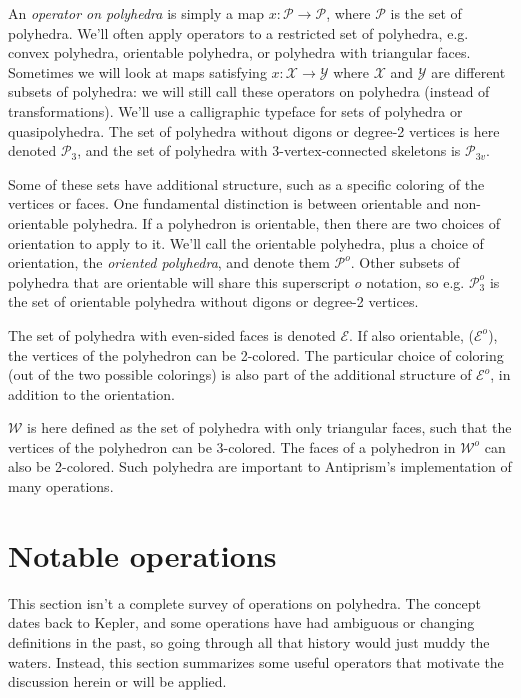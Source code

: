 \documentclass{amsart}[12pt]
\begin{document}
An \textit{operator on polyhedra} is simply a map $x : \mathcal{P} \to
\mathcal{P}$, where $\mathcal{P}$ is the set of polyhedra. We'll often apply
operators to a restricted set of polyhedra, e.g. convex polyhedra, orientable
polyhedra, or polyhedra with triangular faces. Sometimes we will look at maps
satisfying $x : \mathcal{X} \to \mathcal{Y}$ where $\mathcal{X}$ and
$\mathcal{Y}$ are different subsets of polyhedra: we will still call these
operators on polyhedra (instead of transformations). We'll use a calligraphic
typeface for sets of polyhedra or quasipolyhedra. The set of polyhedra without
digons or degree-2 vertices is here denoted $\mathcal{P}_3$, and the set of
polyhedra with 3-vertex-connected skeletons is $\mathcal{P}_{3v}$.

Some of these sets have additional structure, such as a specific coloring of
the vertices or faces. One fundamental distinction is between orientable and
non-orientable polyhedra. If a polyhedron is orientable, then there are two
choices of orientation to apply to it. We'll call the orientable polyhedra,
plus a choice of orientation, the \textit{oriented polyhedra}, and denote them
$\mathcal{P}^o$. Other subsets of polyhedra that are orientable will share this
superscript $o$ notation, so e.g. $\mathcal{P}^o_3$ is the set of orientable
polyhedra without digons or degree-2 vertices.

The set of polyhedra with even-sided faces is denoted $\mathcal{E}$. If also
orientable, ($\mathcal{E}^o$), the vertices of the polyhedron can be 2-colored.
The particular choice of coloring (out of the two possible colorings) is also
part of the additional structure of $\mathcal{E}^o$,
in addition to the orientation.

$\mathcal{W}$ is here defined as the set of polyhedra with only triangular
faces, such that the vertices of the polyhedron can be 3-colored. The faces of
a polyhedron in $\mathcal{W}^o$ can also be 2-colored. Such polyhedra are
important to Antiprism's implementation of many operations.

\section{Notable operations}

This section isn't a complete survey of operations on polyhedra. The concept
dates back to Kepler, and some operations have had ambiguous or changing
definitions in the past, so going through all that history would just muddy the
waters. Instead, this section summarizes some useful operators that motivate
the discussion herein or will be applied.
\end{document}

